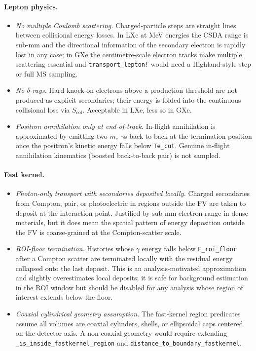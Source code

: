 \documentclass[11pt]{article}
\begin{document}
\paragraph{Lepton physics.}
\begin{itemize}
\item \emph{No multiple Coulomb scattering.} Charged-particle steps are
straight lines between collisional energy losses. In LXe at MeV energies
the CSDA range is sub-mm and the directional information of the secondary
electron is rapidly lost in any case; in GXe the centimetre-scale electron
tracks make multiple scattering essential and \texttt{transport\_lepton!}
would need a Highland-style step or full MS sampling.
\item \emph{No $\delta$-rays.} Hard knock-on electrons above a production
threshold are not produced as explicit secondaries; their energy is folded
into the continuous collisional loss via $S_{\mathrm{col}}$. Acceptable in
LXe, less so in GXe.
\item \emph{Positron annihilation only at end-of-track.} In-flight
annihilation is approximated by emitting two $m_e$ $\gamma$s back-to-back at
the termination position once the positron's kinetic energy falls below
\texttt{Te\_cut}. Genuine in-flight annihilation kinematics (boosted
back-to-back pair) is not sampled.
\end{itemize}

\paragraph{Fast kernel.}
\begin{itemize}
\item \emph{Photon-only transport with secondaries deposited locally.}
Charged secondaries from Compton, pair, or photoelectric in regions outside
the FV are taken to deposit at the interaction point. Justified by sub-mm
electron range in dense materials, but it does mean the spatial pattern of
energy deposition outside the FV is coarse-grained at the Compton-scatter
scale.
\item \emph{ROI-floor termination.} Histories whose $\gamma$ energy falls
below \texttt{E\_roi\_floor} after a Compton scatter are terminated locally
with the residual energy collapsed onto the last deposit. This is an
analysis-motivated approximation and slightly overestimates local deposits;
it is safe for background estimation in the ROI window but should be
disabled for any analysis whose region of interest extends below the floor.
\item \emph{Coaxial cylindrical geometry assumption.} The fast-kernel region
predicates assume all volumes are coaxial cylinders, shells, or ellipsoidal
caps centered on the detector axis. A non-coaxial geometry would require
extending \texttt{\_is\_inside\_fastkernel\_region} and
\texttt{distance\_to\_boundary\_fastkernel}.
\end{itemize}
\end{document}
